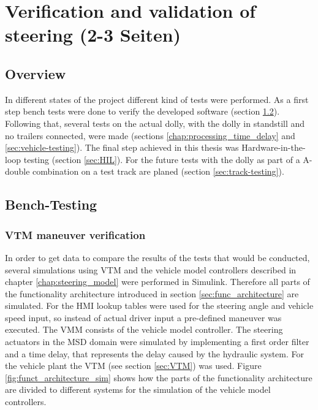 \documentclass[ExampleMasters.tex]{subfiles}
\begin{document}
\clearpage
{\pagestyle{empty}\cleardoublepage}%
\chapter{Verification and validation of steering  (2-3 Seiten)}
\label{chap:testing}

\section{Overview}
In different states of the project different kind of tests were performed. As a first step bench tests were done to verify the developed software (section \ref{sec:bench-testing}). Following that, several tests on the actual dolly, with the dolly in standstill and no trailers connected, were made (sections \ref{chap:processing_time_delay} and \ref{sec:vehicle-testing}). The final step achieved in this thesis was Hardware-in-the-loop testing (section \ref{sec:HIL}).
For the future tests with the dolly as part of a A-double combination on a test track are planed (section \ref{sec:track-testing}).

\section{Bench-Testing}
\label{sec:bench-testing}
\subsection{VTM maneuver verification}

In order to get data to compare the results of the tests that would be conducted, several simulations using \gls{VTM} and the vehicle model controllers described in chapter \ref{chap:steering_model} were performed in Simulink. Therefore all parts of the functionality architecture introduced in section \ref{sec:func_architecture} are simulated.
For the \gls{HMI} lookup tables were used for the steering angle and vehicle speed input, so instead of actual driver input a pre-defined maneuver was executed. The \gls{VMM} consists of the vehicle model controller. The steering actuators in the \gls{MSD} domain were simulated by implementing a first order filter and a time delay, that represents the delay caused by the hydraulic system. For the vehicle plant the \gls{VTM} (see section \ref{sec:VTM}) was used. Figure \ref{fig:funct_architecture_sim} shows how the parts of the functionality architecture are divided to different systems for the simulation of the vehicle model controllers.
\end{document}
